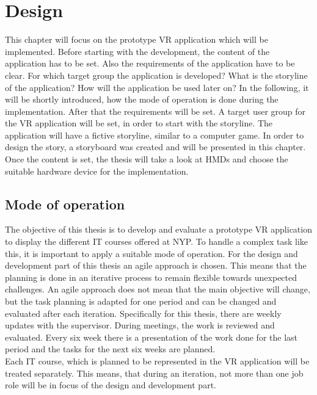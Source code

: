 \chapter{Design}
This chapter will focus on the prototype VR application which will be implemented. Before starting with the development, the content of the  application has to be set. Also the requirements of the application have to be clear. For which target group the application is developed? What is the storyline of the application? How will the application be used later on? In the following, it will be shortly introduced, how the mode of operation is done during the implementation. After that the requirements will be set. A target user group for the VR application will be set, in order to start with the storyline. The application will have a fictive storyline, similar to a computer game. In order to design the story, a storyboard was created and will be presented in this chapter. Once the content is set, the thesis will take a look at HMDs and choose the suitable hardware device for the implementation.
\section{Mode of operation}
The objective of this thesis is to develop and evaluate a prototype VR application to display the different IT courses offered at NYP. To handle a complex task like this, it is important to apply a suitable mode of operation. For the design and development part of this thesis an agile approach is chosen. This means that the planning is done in an iterative process to remain flexible towards unexpected challenges. An agile approach does not mean that the main objective will change, but the task planning is adapted for one period and can be changed and evaluated after each iteration. Specifically for this thesis, there are weekly updates with the supervisor. During meetings, the work is reviewed and evaluated. Every six week there is a presentation of the work done for the last period and the tasks for the next six weeks are planned.\\
Each IT course, which is planned to be represented in the VR application will be treated separately. This means, that during an iteration, not more than one job role will be in focus of the design and development part.  


